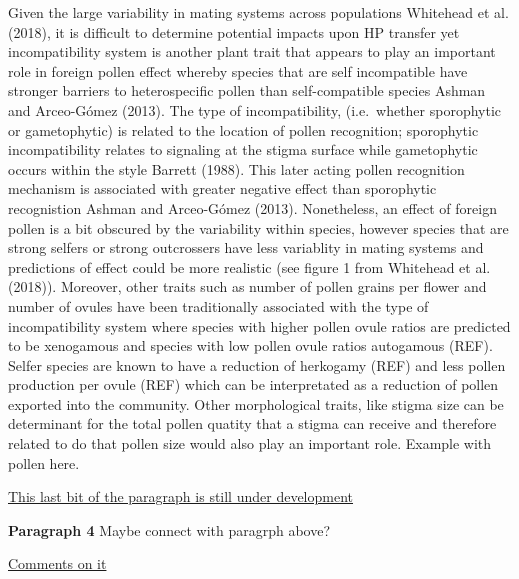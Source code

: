 \documentclass[11pt,a4paper]{article}
\begin{document}
Given the large variability in mating systems across populations
Whitehead et al. (2018), it is difficult to determine potential impacts
upon HP transfer yet incompatibility system is another plant trait that
appears to play an important role in foreign pollen effect whereby
species that are self incompatible have stronger barriers to
heterospecific pollen than self-compatible species Ashman and
Arceo-Gómez (2013). The type of incompatibility, (i.e.~whether
sporophytic or gametophytic) is related to the location of pollen
recognition; sporophytic incompatibility relates to signaling at the
stigma surface while gametophytic occurs within the style Barrett
(1988). This later acting pollen recognition mechanism is associated
with greater negative effect than sporophytic recognistion Ashman and
Arceo-Gómez (2013). Nonetheless, an effect of foreign pollen is a bit
obscured by the variability within species, however species that are
strong selfers or strong outcrossers have less variablity in mating
systems and predictions of effect could be more realistic (see figure 1
from Whitehead et al. (2018)). Moreover, other traits such as number of
pollen grains per flower and number of ovules have been traditionally
associated with the type of incompatibility system where species with
higher pollen ovule ratios are predicted to be xenogamous and species
with low pollen ovule ratios autogamous (REF). Selfer species are known
to have a reduction of herkogamy (REF) and less pollen production per
ovule (REF) which can be interpretated as a reduction of pollen exported
into the community. Other morphological traits, like stigma size can be
determinant for the total pollen quatity that a stigma can receive and
therefore related to do that pollen size would also play an important
role. Example with pollen here.

\href{Jose}{This last bit of the paragraph is still under development}

\textbf{Paragraph 4} Maybe connect with paragrph above?

\href{Romina}{Comments on it}
\end{document}
